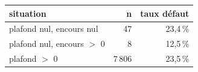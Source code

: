 \begin{tabular}{lrr}
\toprule
\textbf{situation} & \textbf{n} & \textbf{taux défaut} \\
\midrule
plafond nul, encours nul & 47 & 23,4\,\% \\
plafond nul, encours $>$ 0 & 8 & 12,5\,\% \\
plafond $>$ 0 & 7\,806 & 23,5\,\% \\
\bottomrule
\end{tabular}

